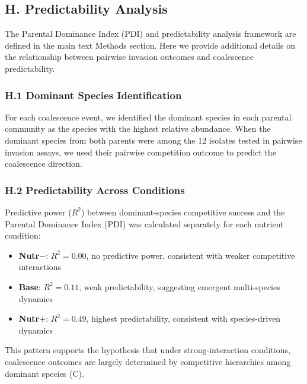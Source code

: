 \subsection*{H. Predictability Analysis}
\label{sec:suppl:predictability}

The Parental Dominance Index (PDI) and predictability analysis framework are defined in the main text Methods section. Here we provide additional details on the relationship between pairwise invasion outcomes and coalescence predictability.

\subsubsection*{H.1 Dominant Species Identification}

For each coalescence event, we identified the dominant species in each parental community as the species with the highest relative abundance. When the dominant species from both parents were among the 12 isolates tested in pairwise invasion assays, we used their pairwise competition outcome to predict the coalescence direction.

\subsubsection*{H.2 Predictability Across Conditions}

Predictive power ($R^2$) between dominant-species competitive success and the Parental Dominance Index (PDI) was calculated separately for each nutrient condition:
\begin{itemize}
    \item \textbf{Nutr$-$}: $R^2 = 0.00$, no predictive power, consistent with weaker competitive interactions
    \item \textbf{Base}: $R^2 = 0.11$, weak predictability, suggesting emergent multi-species dynamics
    \item \textbf{Nutr$+$}: $R^2 = 0.49$, highest predictability, consistent with species-driven dynamics
\end{itemize}

This pattern supports the hypothesis that under strong-interaction conditions, coalescence outcomes are largely determined by competitive hierarchies among dominant species (C).


